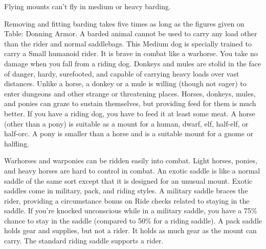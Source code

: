 \par Flying mounts can't fly in medium or heavy barding.
\par Removing and fitting barding takes five times as long as the figures given on Table: Donning Armor. A barded animal cannot be used to carry any load other than the rider and normal saddlebags.
 This Medium dog is specially trained to carry a Small humanoid rider. It is brave in combat like a warhorse. You take no damage when you fall from a riding dog.
 Donkeys and mules are stolid in the face of danger, hardy, surefooted, and capable of carrying heavy loads over vast distances. Unlike a horse, a donkey or a mule is willing (though not eager) to enter dungeons and other strange or threatening places.
 Horses, donkeys, mules, and ponies can graze to sustain themselves, but providing feed for them is much better. If you have a riding dog, you have to feed it at least some meat.
 A horse (other than a pony) is suitable as a mount for a human, dwarf, elf, half-elf, or half-orc. A pony is smaller than a horse and is a suitable mount for a gnome or halfling.
\par Warhorses and warponies can be ridden easily into combat. Light horses, ponies, and heavy horses are hard to control in combat.
 An exotic saddle is like a normal saddle of the same sort except that it is designed for an unusual mount. Exotic saddles come in military, pack, and riding styles.
 A military saddle braces the rider, providing a  circumstance bonus on Ride checks related to staying in the saddle. If you're knocked unconscious while in a military saddle, you have a 75\% chance to stay in the saddle (compared to 50\% for a riding saddle).
 A pack saddle holds gear and supplies, but not a rider. It holds as much gear as the mount can carry.
 The standard riding saddle supports a rider.

